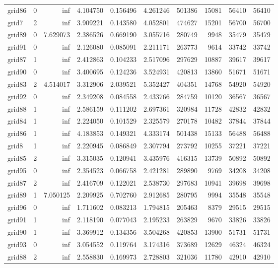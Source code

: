 \documentclass[../../../thesis.tex]{subfiles}
\begin{document}
\begin{longtable}{|l|r|r|r|r|r|r|r|r|r|}
grid86 & 0 & inf & 4.104750 & 0.156496 & 4.261246 & 501386 & 15081 & 56410 & 56410 \\
grid7 & 2 & inf & 3.909221 & 0.143580 & 4.052801 & 474627 & 15201 & 56700 & 56700 \\
grid89 & 0 & 7.629073 & 2.386526 & 0.669190 & 3.055716 & 280749 & 9948 & 35479 & 35479 \\
grid91 & 0 & inf & 2.126080 & 0.085091 & 2.211171 & 263773 & 9614 & 33742 & 33742 \\
grid87 & 1 & inf & 2.412863 & 0.104233 & 2.517096 & 297629 & 10887 & 39617 & 39617 \\
grid90 & 0 & inf & 3.400695 & 0.124236 & 3.524931 & 420813 & 13860 & 51671 & 51671 \\
grid83 & 2 & 4.514017 & 3.312906 & 2.039521 & 5.352427 & 404351 & 14768 & 54920 & 54920 \\
grid92 & 0 & inf & 2.349208 & 0.084558 & 2.433766 & 284759 & 10120 & 36567 & 36567 \\
grid88 & 1 & inf & 2.586159 & 0.111202 & 2.697361 & 320984 & 11728 & 42832 & 42832 \\
grid84 & 1 & inf & 2.224050 & 0.101529 & 2.325579 & 270178 & 10482 & 37844 & 37844 \\
grid86 & 1 & inf & 4.183853 & 0.149321 & 4.333174 & 501438 & 15133 & 56488 & 56488 \\
grid8 & 1 & inf & 2.220945 & 0.086849 & 2.307794 & 273792 & 10255 & 37221 & 37221 \\
grid85 & 2 & inf & 3.315035 & 0.120941 & 3.435976 & 416315 & 13739 & 50892 & 50892 \\
grid95 & 0 & inf & 2.354523 & 0.066758 & 2.421281 & 289890 & 9769 & 34208 & 34208 \\
grid87 & 2 & inf & 2.416709 & 0.122021 & 2.538730 & 297683 & 10941 & 39698 & 39698 \\
grid89 & 1 & 7.050125 & 2.209925 & 0.702760 & 2.912685 & 280795 & 9994 & 35548 & 35548 \\
grid96 & 0 & inf & 1.711602 & 0.083213 & 1.794815 & 205463 & 8379 & 29515 & 29515 \\
grid91 & 1 & inf & 2.118190 & 0.077043 & 2.195233 & 263829 & 9670 & 33826 & 33826 \\
grid90 & 1 & inf & 3.369912 & 0.134356 & 3.504268 & 420853 & 13900 & 51731 & 51731 \\
grid93 & 0 & inf & 3.054552 & 0.119764 & 3.174316 & 373689 & 12629 & 46324 & 46324 \\
grid88 & 2 & inf & 2.558830 & 0.169973 & 2.728803 & 321036 & 11780 & 42910 & 42910 \\

\end{longtable}
\end{document}
